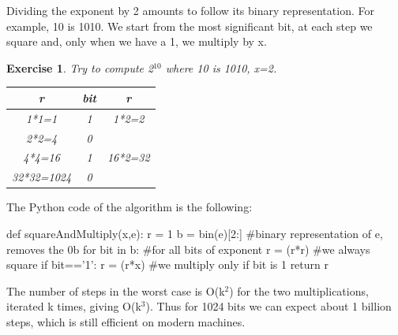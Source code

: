 \documentclass[a4paper, 12pt]{report}
\newtheorem{exercise}{\textbf{Exercise}}
\begin{document}
Dividing the exponent by 2 amounts to follow its binary representation. For example, 10 is 1010. We start from the most significant bit, at each step we square and, only when we have a 1, we multiply by x.
\newpage
\begin{exercise}
	Try to compute 2$^{10}$ where 10 is 1010, x=2.
	\begin{table}[H]
		\centering
		\begin{tabular}{|c|c|c|}
			\hline
			\textbf{r} & \textbf{bit} & \textbf{r}\\ \hline
			1*1=1 & 1 & 1*2=2\\
			2*2=4 & 0 & \\
			4*4=16 & 1 & 16*2=32\\
			32*32=1024 & 0 &\\ \hline
		\end{tabular}
	\end{table}
\end{exercise}

The Python code of the algorithm is the following:
\begin{python}
	def squareAndMultiply(x,e):
		r = 1
		b = bin(e)[2:]		#binary representation of e, removes the 0b
		for bit in b:			#for all bits of exponent
			r = (r*r)				#we always square
			if bit=='1':
				r = (r*x)			#we multiply only if bit is 1
		return r
\end{python}

The number of steps in the worst case is O(k$^2$) for the two multiplications, iterated k times, giving O(k$^3$). Thus for 1024 bits we can expect about 1 billion steps, which is still efficient on modern machines.
\end{document}
